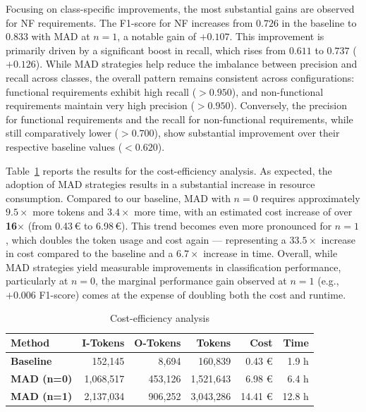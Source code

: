 \documentclass[conference]{IEEEtran}
\begin{document}
Focusing on class-specific improvements, the most substantial gains are observed for NF requirements. The F1-score for NF increases from $0.726$ in the baseline to $0.833$ with MAD at $n = 1$, a notable gain of $+0.107$. This improvement is primarily driven by a significant boost in recall, which rises from $0.611$ to $0.737$ ($+0.126$). While MAD strategies help reduce the imbalance between precision and recall across classes, the overall pattern remains consistent across configurations: functional requirements exhibit high recall ($>0.950$), and non-functional requirements maintain very high precision ($>0.950$). Conversely, the precision for functional requirements and the recall for non-functional requirements, while still comparatively lower ($>0.700$), show substantial improvement over their respective baseline values ($<0.620$).


Table~\ref{tab:cost-efficiency} reports the results for the cost-efficiency analysis. As expected, the adoption of MAD strategies results in a substantial increase in resource consumption. Compared to our baseline, MAD with $n=0$ requires approximately $9.5\times$ more tokens and $3.4\times$ more time, with an estimated cost increase of over \textbf{16$\times$} (from 0.43\,€ to 6.98\,€). This trend becomes even more pronounced for $n=1$, which doubles the token usage and cost again — representing a $33.5\times$ increase in cost compared to the baseline and a $6.7\times$ increase in time. Overall, while MAD strategies yield measurable improvements in classification performance, particularly at $n=0$, the marginal performance gain observed at $n=1$ (e.g., $+0.006$ F1-score) comes at the expense of doubling both the cost and runtime. 


\begin{table}[h]
\caption{Cost-efficiency analysis}
\label{tab:cost-efficiency}
\begin{tabular}
{@{}lrrrrr@{}}
\toprule
\textbf{Method}                                     & \textbf{I-Tokens} & \textbf{O-Tokens} & \textbf{Tokens} & \textbf{Cost} & \textbf{Time} \\ \midrule
\textbf{Baseline} & 152,145 & 8,694 & 160,839 & 0.43 € & 1.9 h \\ 
\textbf{MAD (n=0)} & 1,068,517 & 453,126 & 1,521,643 & 6.98 € & 6.4 h\\ 
\textbf{MAD (n=1)} & 2,137,034 & 906,252 & 3,043,286 & 14.41 € & 12.8 h \\ 
\bottomrule
\end{tabular}
\end{table}
\end{document}

